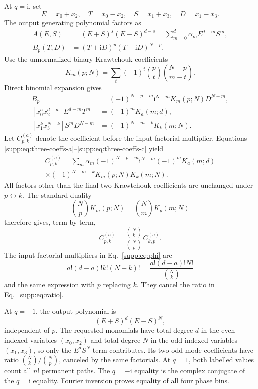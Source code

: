 \documentclass[aps,pra,onecolumn,amsmath,amssymb,superscriptaddress,longbibliography]{revtex4-2}
\newcommand{\ii}{\mathrm{i}}
\begin{document}
At $q=\ii$, set
\begin{equation}
E=x_0+x_2,\quad T=x_0-x_2,\quad
S=x_1+x_3,\quad D=x_1-x_3.
\end{equation}
The output generating polynomial factors as
\begin{align}
A(E,S)&=(E+S)^s(E-S)^{d-s}
=\sum_{m=0}^{d}\alpha_m E^{d-m}S^m,\nonumber\\
B_p(T,D)&=(T+\ii D)^p(T-\ii D)^{N-p}.
\end{align}
Use the unnormalized binary Krawtchouk coefficients
\begin{equation}
K_m(p;N)=
\sum_t(-1)^t\binom pt\binom{N-p}{m-t}.
\end{equation}
Direct binomial expansion gives
\begin{align}
[T^m]B_p
&=(-1)^{N-p-m}\ii^{N-m}K_m(p;N)D^{N-m},
\label{supp:eq:three-coeffs-a}\\
[x_0^ax_2^{d-a}]E^{d-m}T^m
&=(-1)^mK_a(m;d),
\label{supp:eq:three-coeffs-b}\\
[x_1^kx_3^{N-k}]S^mD^{N-m}
&=(-1)^{N-m-k}K_k(m;N).
\label{supp:eq:three-coeffs-c}
\end{align}
Let $C^{(a)}_{p,k}$ denote the coefficient before the input-factorial
multiplier.  Equations
\eqref{supp:eq:three-coeffs-a}--\eqref{supp:eq:three-coeffs-c} yield
\begin{multline}
C^{(a)}_{p,k}
=\sum_m\alpha_m
(-1)^{N-p-m}\ii^{N-m}
(-1)^mK_a(m;d)\\
\times(-1)^{N-m-k}
K_m(p;N)K_k(m;N).
\label{supp:eq:coefficient-sum}
\end{multline}
All factors other than the final two Krawtchouk coefficients are unchanged
under $p\leftrightarrow k$.  The standard duality
\begin{equation}
\binom NpK_m(p;N)=\binom NmK_p(m;N)
\label{supp:eq:duality}
\end{equation}
therefore gives, term by term,
\begin{equation}
C^{(a)}_{p,k}
=\frac{\binom Nk}{\binom Np}C^{(a)}_{k,p}.
\label{supp:eq:ratio}
\end{equation}
The input-factorial multipliers in Eq.~\eqref{supp:eq:phi} are
\begin{equation}
a!(d-a)!k!(N-k)!
=\frac{a!(d-a)!N!}{\binom Nk}
\end{equation}
and the same expression with $p$ replacing $k$.  They cancel the ratio in
Eq.~\eqref{supp:eq:ratio}.

At $q=-1$, the output polynomial is
\begin{equation}
(E+S)^d(E-S)^N,
\end{equation}
independent of $p$.  The requested monomials have total degree $d$ in the
even-indexed variables $(x_0,x_2)$ and total degree $N$ in the odd-indexed
variables $(x_1,x_3)$, so only the $E^dS^N$ term contributes.  Its two
odd-mode coefficients have ratio $\binom Nk/\binom Np$, canceled by the
same factorials.  At $q=1$, both labelled values count all $n!$ permanent
paths.  The $q=-\ii$ equality is the complex conjugate of the $q=\ii$
equality.  Fourier inversion proves equality of all four phase bins.
\end{document}
